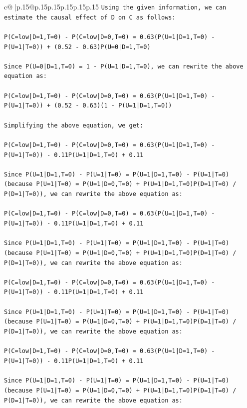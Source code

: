 \documentclass{article}
\begin{document}
{\begin{supertabular}{c@{$\;$}|p{.15\linewidth}@{}p{.15\linewidth}p{.15\linewidth}p{.15\linewidth}p{.15\linewidth}p{.15\linewidth}}
{{{\texttt{Using the given information, we can estimate the causal effect of D on C as follows:} \\
\\ 
\texttt{P(C=low|D=1,T=0) {-} P(C=low|D=0,T=0) = 0.63(P(U=1|D=1,T=0) {-} P(U=1|T=0)) + (0.52 {-} 0.63)P(U=0|D=1,T=0)} \\
\\ 
\texttt{Since P(U=0|D=1,T=0) = 1 {-} P(U=1|D=1,T=0), we can rewrite the above equation as:} \\
\\ 
\texttt{P(C=low|D=1,T=0) {-} P(C=low|D=0,T=0) = 0.63(P(U=1|D=1,T=0) {-} P(U=1|T=0)) + (0.52 {-} 0.63)(1 {-} P(U=1|D=1,T=0))} \\
\\ 
\texttt{Simplifying the above equation, we get:} \\
\\ 
\texttt{P(C=low|D=1,T=0) {-} P(C=low|D=0,T=0) = 0.63(P(U=1|D=1,T=0) {-} P(U=1|T=0)) {-} 0.11P(U=1|D=1,T=0) + 0.11} \\
\\ 
\texttt{Since P(U=1|D=1,T=0) {-} P(U=1|T=0) = P(U=1|D=1,T=0) {-} P(U=1|T=0) (because P(U=1|T=0) = P(U=1|D=0,T=0) + P(U=1|D=1,T=0)P(D=1|T=0) / P(D=1|T=0)), we can rewrite the above equation as:} \\
\\ 
\texttt{P(C=low|D=1,T=0) {-} P(C=low|D=0,T=0) = 0.63(P(U=1|D=1,T=0) {-} P(U=1|T=0)) {-} 0.11P(U=1|D=1,T=0) + 0.11} \\
\\ 
\texttt{Since P(U=1|D=1,T=0) {-} P(U=1|T=0) = P(U=1|D=1,T=0) {-} P(U=1|T=0) (because P(U=1|T=0) = P(U=1|D=0,T=0) + P(U=1|D=1,T=0)P(D=1|T=0) / P(D=1|T=0)), we can rewrite the above equation as:} \\
\\ 
\texttt{P(C=low|D=1,T=0) {-} P(C=low|D=0,T=0) = 0.63(P(U=1|D=1,T=0) {-} P(U=1|T=0)) {-} 0.11P(U=1|D=1,T=0) + 0.11} \\
\\ 
\texttt{Since P(U=1|D=1,T=0) {-} P(U=1|T=0) = P(U=1|D=1,T=0) {-} P(U=1|T=0) (because P(U=1|T=0) = P(U=1|D=0,T=0) + P(U=1|D=1,T=0)P(D=1|T=0) / P(D=1|T=0)), we can rewrite the above equation as:} \\
\\ 
\texttt{P(C=low|D=1,T=0) {-} P(C=low|D=0,T=0) = 0.63(P(U=1|D=1,T=0) {-} P(U=1|T=0)) {-} 0.11P(U=1|D=1,T=0) + 0.11} \\
\\ 
\texttt{Since P(U=1|D=1,T=0) {-} P(U=1|T=0) = P(U=1|D=1,T=0) {-} P(U=1|T=0) (because P(U=1|T=0) = P(U=1|D=0,T=0) + P(U=1|D=1,T=0)P(D=1|T=0) / P(D=1|T=0)), we can rewrite the above equation as:} \\
}}}
\end{supertabular}}
\end{document}
